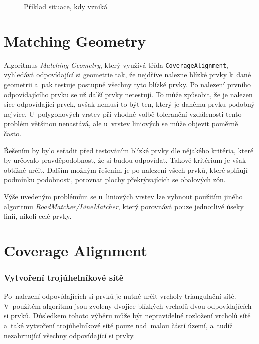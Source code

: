   \begin{figure}[H]
    \centering
      \def\svgwidth{300pt}
      
      \caption{Příklad situace, kdy vzniká }
      \label{fig:toothpic}
  \end{figure}


\section{Matching Geometry}
\label{problemy-mg}

Algoritmus \textit{Matching Geometry}, který využívá třída 
\texttt{CoverageAlignment}, vyhledává od\-po\-vídající si geometrie tak,
že nejdříve nalezne blízké prvky k~dané geometrii a~pak testuje postupně všechny
tyto blízké prvky. Po nalezení prvního odpovídajícího prvku se už další prvky
netestují. To může způsobit, že je nalezen sice odpovídající prvek, avšak
nemusí to být ten, který je danému prvku podobný nej\-více. U~polygonových vrstev
při vhodné volbě tole\-ranční vzdálenosti tento problém většinou nenastává, 
ale u~vrstev liniových se může objevit poměrně často. 

Řešením by bylo seřadit před testováním blízké prvky dle nějakého
kritéria, které by určovalo pravděpodobnost, že si budou odpovídat. Takové
kritérium je však obtížné určit. Dalším možným řešením je po nalezení všech 
prvků, které splňují podmínku podobnosti, porovnat plochy překrývajících se 
obalových zón. 

Výše uvedeným problémům se u~liniových vrstev lze vyhnout použitím jiného
algoritmu \textit{RoadMatcher/LineMatcher}, který porovnává pouze jednotlivé
úseky linií, nikoli celé prvky. 

\section{Coverage Alignment}
\label{problemy-ca}

\subsubsection{Vytvoření trojúhelníkové sítě}
Po~nalezení odpovídajících si prvků je nutné určit vrcholy triangulační sítě.
V~po\-užitém algoritmu jsou zvoleny dvojice blízkých vrcholů dvou odpovídajících
si prvků. Důsledkem tohoto výběru může být nepravidelné rozložení vrcholů sítě
a~také vy\-tvoření trojúhelníkové sítě pouze nad~malou částí území, a~tudíž 
nezahrnující všechny odpovídající si prvky.

